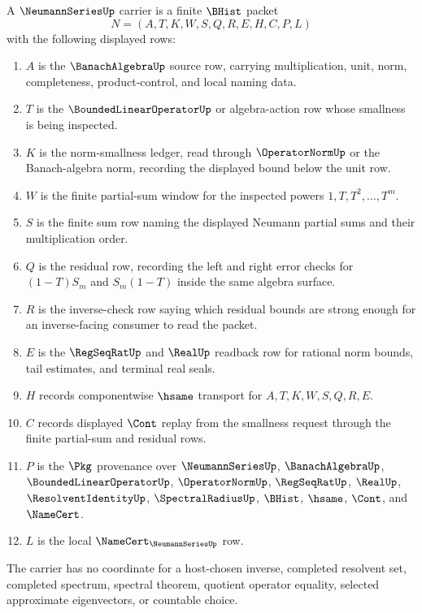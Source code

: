 \begin{definition}
\label{def:neumann-series-carrier}
A $\NeumannSeriesUp$ carrier is a finite $\BHist$ packet
$$
N=(A,T,K,W,S,Q,R,E,H,C,P,L)
$$
with the following displayed rows:
\begin{enumerate}
\item $A$ is the $\BanachAlgebraUp$ source row, carrying multiplication, unit, norm, completeness, product-control, and local naming data.
\item $T$ is the $\BoundedLinearOperatorUp$ or algebra-action row whose smallness is being inspected.
\item $K$ is the norm-smallness ledger, read through $\OperatorNormUp$ or the Banach-algebra norm, recording the displayed bound below the unit row.
\item $W$ is the finite partial-sum window for the inspected powers $1,T,T^2,\ldots,T^m$.
\item $S$ is the finite sum row naming the displayed Neumann partial sums and their multiplication order.
\item $Q$ is the residual row, recording the left and right error checks for $(1-T)S_m$ and $S_m(1-T)$ inside the same algebra surface.
\item $R$ is the inverse-check row saying which residual bounds are strong enough for an inverse-facing consumer to read the packet.
\item $E$ is the $\RegSeqRatUp$ and $\RealUp$ readback row for rational norm bounds, tail estimates, and terminal real seals.
\item $H$ records componentwise $\hsame$ transport for $A,T,K,W,S,Q,R,E$.
\item $C$ records displayed $\Cont$ replay from the smallness request through the finite partial-sum and residual rows.
\item $P$ is the $\Pkg$ provenance over $\NeumannSeriesUp$, $\BanachAlgebraUp$, $\BoundedLinearOperatorUp$, $\OperatorNormUp$, $\RegSeqRatUp$, $\RealUp$, $\ResolventIdentityUp$, $\SpectralRadiusUp$, $\BHist$, $\hsame$, $\Cont$, and $\NameCert$.
\item $L$ is the local $\NameCert_{\NeumannSeriesUp}$ row.
\end{enumerate}
The carrier has no coordinate for a host-chosen inverse, completed resolvent set, completed spectrum, spectral theorem, quotient operator equality, selected approximate eigenvectors, or countable choice.
\end{definition}

